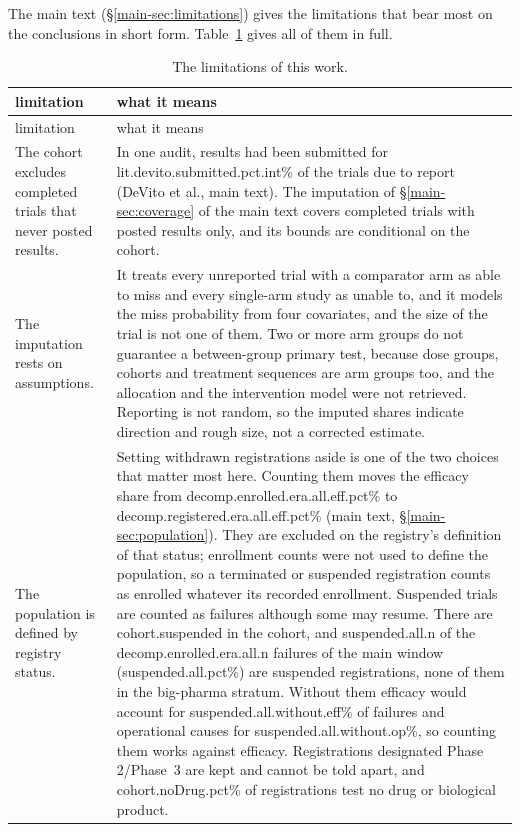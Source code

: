\documentclass[11pt]{article}
\makeatletter
\renewcommand\section{\@startsection{section}{1}{\z@}{-3.5ex \@plus -1ex \@minus -.2ex}{2.3ex \@plus.2ex}{\normalfont\Large\bfseries\raggedright}}
\makeatother
\begin{document}
\clearpage
\section{The limitations in full}\label{supp:limitations}
The main text (\S\ref{main-sec:limitations}) gives the limitations that bear most on the conclusions in short form. Table~\ref{tab:limitations} gives all of them in full.

\footnotesize
\begin{longtable}{>{\raggedright\arraybackslash}p{}>{\raggedright\arraybackslash}p{}}
\caption{The limitations of this work.}\label{tab:limitations}\\
\toprule
limitation & what it means \\
\midrule
\endfirsthead
\toprule
limitation & what it means \\
\midrule
\endhead
\bottomrule
\endlastfoot
The cohort excludes completed trials that never posted results. & In one audit, results had been submitted for \num{lit.devito.submitted.pct.int}\% of the trials due to report (DeVito et al., main text). The imputation of \S\ref{main-sec:coverage} of the main text covers completed trials with posted results only, and its bounds are conditional on the cohort. \\
\addlinespace
The imputation rests on assumptions. & It treats every unreported trial with a comparator arm as able to miss and every single-arm study as unable to, and it models the miss probability from four covariates, and the size of the trial is not one of them. Two or more arm groups do not guarantee a between-group primary test, because dose groups, cohorts and treatment sequences are arm groups too, and the allocation and the intervention model were not retrieved. Reporting is not random, so the imputed shares indicate direction and rough size, not a corrected estimate. \\
\addlinespace
The population is defined by registry status. & Setting withdrawn registrations aside is one of the two choices that matter most here. Counting them moves the efficacy share from \num{decomp.enrolled.era.all.eff.pct}\% to \num{decomp.registered.era.all.eff.pct}\% (main text, \S\ref{main-sec:population}). They are excluded on the registry's definition of that status; enrollment counts were not used to define the population, so a terminated or suspended registration counts as enrolled whatever its recorded enrollment. Suspended trials are counted as failures although some may resume. There are \num{cohort.suspended} in the cohort, and \num{suspended.all.n} of the \num{decomp.enrolled.era.all.n} failures of the main window (\num{suspended.all.pct}\%) are suspended registrations, none of them in the big-pharma stratum. Without them efficacy would account for \num{suspended.all.without.eff}\% of failures and operational causes for \num{suspended.all.without.op}\%, so counting them works against efficacy. Registrations designated Phase 2/Phase~3 are kept and cannot be told apart, and \num{cohort.noDrug.pct}\% of registrations test no drug or biological product. \\

\end{longtable}
\end{document}
